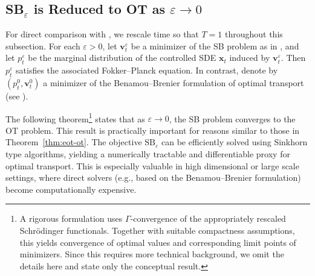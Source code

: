 \subsection{SB$_\varepsilon$ is Reduced to OT as $\varepsilon\to 0$}\label{subsec:sb-ot} 
For direct comparison with , we rescale time so that
$T=1$ throughout this subsection. For each $\varepsilon > 0$, let $\mathbf{v}_t^\varepsilon$ be a minimizer of the SB problem as in , and let $p_t^\varepsilon$ be the marginal distribution of the controlled SDE $\mathbf{x}_t$ induced by $\mathbf{v}_t^\varepsilon$. Then $p_t^\varepsilon$ satisfies the associated Fokker–Planck equation. In contrast, denote by $(p_t^0, \mathbf{v}_t^0)$ a minimizer of the Benamou–Brenier formulation of optimal transport (see ).

The following theorem\footnote{A rigorous formulation uses $\Gamma$-convergence of the
appropriately rescaled Schr\"odinger functionals. Together with suitable
compactness assumptions, this yields convergence of optimal values and
corresponding limit points of minimizers. Since this requires more technical background, we omit the details here and state only the conceptual result.} states that as $\varepsilon \to 0$, the SB problem converges to the OT problem. This result is practically important for reasons similar to those in Theorem~\ref{thm:eot-ot}. The objective $ \mathrm{SB}_\varepsilon $ can be efficiently solved using Sinkhorn type algorithms, yielding a numerically tractable and differentiable proxy for optimal transport. This is especially valuable in high dimensional or large scale settings, where direct solvers (e.g., based on the Benamou–Brenier formulation) become computationally expensive.






